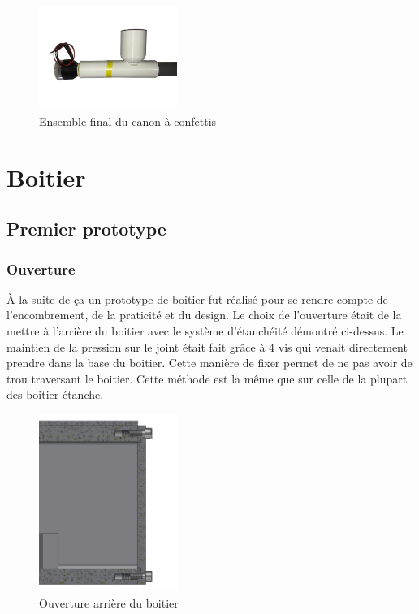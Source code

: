 \begin{figure}[H]
    \centering
    \includegraphics[width=0.4\textwidth]{Images/photos_PGA/canonComplpetv2-removebg-preview.png}
    \caption{Ensemble final du canon à confettis}
    \label{fig:canonensemble}
\end{figure}

\section{Boitier}

\subsection{Premier prototype}

\subsubsection{Ouverture}

À la suite de ça un prototype de boitier fut réalisé pour se rendre compte de l’encombrement, de la 
praticité et du design. Le choix de l’ouverture était de la mettre à l’arrière du boitier avec le 
système d’étanchéité démontré ci-dessus. Le maintien de la pression sur le joint était fait grâce à 
4 vis qui venait directement prendre dans la base du boitier. Cette manière de fixer permet de ne 
pas avoir de trou traversant le boitier. Cette méthode est la même que sur celle de la plupart des 
boitier étanche.

\begin{figure}[H]
    \centering
    \includegraphics[width=0.4\textwidth]{Images/photos_PGA/Arrièreboitierv3coté.PNG}
    \caption{Ouverture arrière du boitier}
    \label{fig:vuearriereboitier}
\end{figure}

